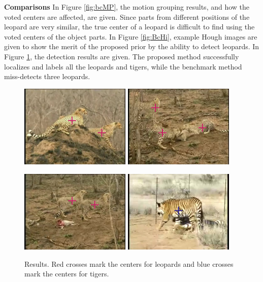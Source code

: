 \textbf{Comparisons}
In Figure \ref{fig:bcMP}, the motion grouping results, and how the voted centers are affected, are given. Since parts from different positions of the leopard are very similar, the true center of a leopard is difficult to find using the voted centers of the object parts. In Figure \ref{fig:BcHi}, example Hough images are given to show the merit of the proposed prior by the ability to detect leopards. In Figure \ref{fig:bgdr}, the detection results are given. The proposed method successfully localizes and labels all the leopards and tigers, while the benchmark method miss-detects three leopards.

\begin{figure}
\centering
\includegraphics[width=0.47\textwidth,bb=0 0 640 480]{leo1.jpg}
\includegraphics[width=0.47\textwidth,bb=0 0 640 480]{leo2.jpg}

\includegraphics[width=0.47\textwidth,bb=0 0 640 480]{leo3.jpg}
\includegraphics[width=0.47\textwidth,bb=0 0 640 480]{ti1.jpg}

\caption[Detection results]{Results. Red crosses mark the centers for leopards and blue crosses mark the centers for tigers.}
\label{fig:bgdr}
\end{figure}
